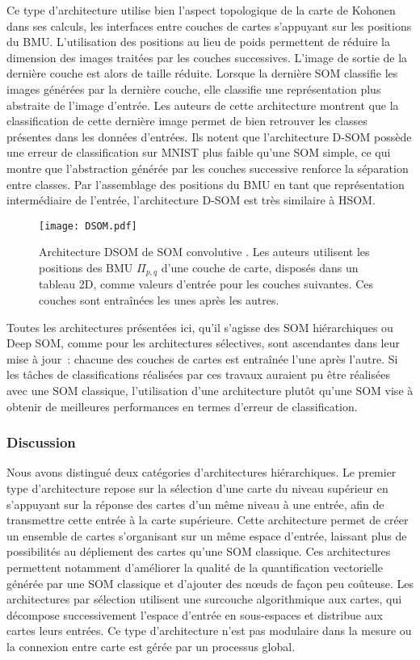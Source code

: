 \documentclass[../main]{subfiles}
\begin{document}
Ce type d'architecture utilise bien l'aspect topologique de la carte de Kohonen dans ses calculs, les interfaces entre couches de cartes s'appuyant sur les positions du BMU. L'utilisation des positions au lieu de poids permettent de réduire la dimension des images traitées par les couches successives. L'image de sortie de la dernière couche est alors de taille réduite. Lorsque la dernière SOM classifie les images générées par la dernière couche, elle classifie une représentation plus abstraite de l'image d'entrée. 
Les auteurs de cette architecture montrent que la classification de cette dernière image permet de bien retrouver les classes présentes dans les données d'entrées. Ils notent que l'architecture D-SOM possède une erreur de classification sur MNIST plus faible qu'une SOM simple, ce qui montre que l'abstraction générée par les couches successive renforce la séparation entre classes.
Par l'assemblage des positions du BMU en tant que représentation intermédiaire de l'entrée, l'architecture D-SOM est très similaire à HSOM.

\begin{figure}[t]
    \texttt{[image: DSOM.pdf]}
    \caption{Architecture DSOM de SOM \og convolutive \fg{} \parencite{liu_deep_2015}. Les auteurs utilisent les positions des BMU $\Pi_{p,q}$ d'une couche de carte, disposés dans un tableau 2D, comme valeurs d'entrée pour les couches suivantes. Ces couches sont entraînées les unes après les autres. \label{fig:dsom}}
\end{figure}

Toutes les architectures présentées ici, qu'il s'agisse des SOM hiérarchiques ou Deep SOM, comme pour les architectures sélectives, sont ascendantes dans leur mise à jour~: chacune des couches de cartes est entraînée l'une après l'autre. 
Si les tâches de classifications réalisées par ces travaux auraient pu être réalisées avec une SOM classique, l'utilisation d'une architecture plutôt qu'une SOM vise à obtenir de meilleures performances en termes d'erreur de classification.

\subsubsection{Discussion}

Nous avons distingué deux catégories d'architectures hiérarchiques. Le premier type d'architecture repose sur la sélection d'une carte du niveau supérieur en s'appuyant sur la réponse des cartes d'un même niveau à une entrée, afin de transmettre cette entrée à la carte supérieure. Cette architecture permet de créer un ensemble de cartes s'organisant sur un même espace d'entrée, laissant plus de possibilités au dépliement des cartes qu'une SOM classique. Ces architectures permettent notamment d'améliorer la qualité de la quantification vectorielle générée par une SOM classique et d'ajouter des n\oe{}uds de façon peu coûteuse. Les architectures par sélection utilisent une surcouche algorithmique aux cartes, qui décompose successivement l'espace d'entrée en sous-espaces et distribue aux cartes leurs entrées. Ce type d'architecture n'est pas modulaire dans la mesure ou la connexion entre carte est gérée par un processus global.
\end{document}
